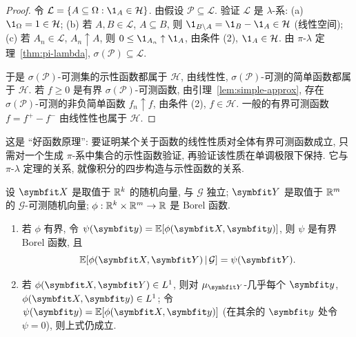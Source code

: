 \begin{proof}
令 $\mathcal{L}=\{A\subseteq\Omega: \1_A\in\mathcal{H}\}$. 由假设 $\mathcal{P}\subseteq\mathcal{L}$. 验证 $\mathcal{L}$ 是 $\lambda$-系: (a) $\1_\Omega=1\in\mathcal{H}$; (b) 若 $A,B\in\mathcal{L}$, $A\subseteq B$, 则 $\1_{B\setminus A}=\1_B-\1_A\in\mathcal{H}$ (线性空间); (c) 若 $A_n\in\mathcal{L}$, $A_n\uparrow A$, 则 $0\le\1_{A_n}\uparrow\1_A$, 由条件 (2), $\1_A\in\mathcal{H}$. 由 $\pi$-$\lambda$ 定理~\ref{thm:pi-lambda}, $\sigma(\mathcal{P})\subseteq\mathcal{L}$.

于是 $\sigma(\mathcal{P})$-可测集的示性函数都属于 $\mathcal{H}$, 由线性性, $\sigma(\mathcal{P})$-可测的简单函数都属于 $\mathcal{H}$. 若 $f\ge0$ 是有界 $\sigma(\mathcal{P})$-可测函数, 由引理~\ref{lem:simple-approx}, 存在 $\sigma(\mathcal{P})$-可测的非负简单函数 $f_n\uparrow f$, 由条件 (2), $f\in\mathcal{H}$. 一般的有界可测函数 $f=f^+-f^-$ 由线性性也属于 $\mathcal{H}$.
\end{proof}

\begin{intuition}
这是 ``好函数原理'': 要证明某个关于函数的线性性质对全体有界可测函数成立, 只需对一个生成 $\pi$-系中集合的示性函数验证, 再验证该性质在单调极限下保持. 它与 $\pi$-$\lambda$ 定理的关系, 就像积分的四步构造与示性函数的关系.
\end{intuition}

\begin{lemma}[代入引理]\label{lem:freezing}
设 $\rvec{X}$ 是取值于 $\mathbb{R}^k$ 的随机向量, 与 $\mathcal{G}$ 独立; $\rvec{Y}$ 是取值于 $\mathbb{R}^m$ 的 $\mathcal{G}$-可测随机向量; $\phi:\mathbb{R}^k\times\mathbb{R}^m\to\mathbb{R}$ 是 Borel 函数.
\begin{enumerate}
\item 若 $\phi$ 有界, 令 $\psi(\rvec{y})=\E[\phi(\rvec{X},\rvec{y})]$, 则 $\psi$ 是有界 Borel 函数, 且
\[
\E[\phi(\rvec{X},\rvec{Y})\,|\,\mathcal{G}]=\psi(\rvec{Y}).
\]
\item 若 $\phi(\rvec{X},\rvec{Y})\in L^1$, 则对 $\mu_{\rvec{Y}}$-几乎每个 $\rvec{y}$, $\phi(\rvec{X},\rvec{y})\in L^1$; 令 $\psi(\rvec{y})=\E[\phi(\rvec{X},\rvec{y})]$ (在其余的 $\rvec{y}$ 处令 $\psi=0$), 则上式仍成立.
\end{enumerate}
\end{lemma}

